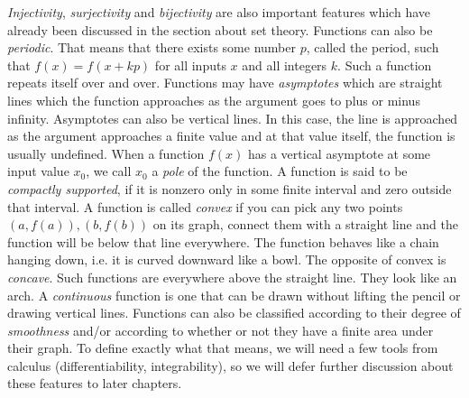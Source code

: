 \emph{Injectivity}, \emph{surjectivity} and \emph{bijectivity} are also important features which have already been discussed in the section about set theory. Functions can also be \emph{periodic}. That means that there exists some number $p$, called the period, such that $f(x) = f(x + k p)$ for all inputs $x$ and all integers $k$. Such a function repeats itself over and over. Functions may have \emph{asymptotes} which are straight lines which the function approaches as the argument goes to plus or minus infinity. Asymptotes can also be vertical lines. In this case, the line is approached as the argument approaches a finite value and at that value itself, the function is usually undefined. When a function $f(x)$ has a vertical asymptote at some input value $x_0$, we call $x_0$ a \emph{pole} of the function. A function is said to be \emph{compactly supported}, if it is nonzero only in some finite interval and zero outside that interval. A function is called \emph{convex} if you can pick any two points $(a,f(a)),(b,f(b))$ on its graph, connect them with a straight line and the function will be below that line everywhere. The function behaves like a chain hanging down, i.e. it is curved downward like a bowl. The opposite of convex is \emph{concave}. Such functions are everywhere above the straight line. They look like an arch. A \emph{continuous} function is one that can be drawn without lifting the pencil or drawing vertical lines. Functions can also be classified according to their degree of \emph{smoothness} and/or according to whether or not they have a finite area under their graph. To define exactly what that means, we will need a few tools from calculus (differentiability, integrability), so we will defer further discussion about these features to later chapters.


